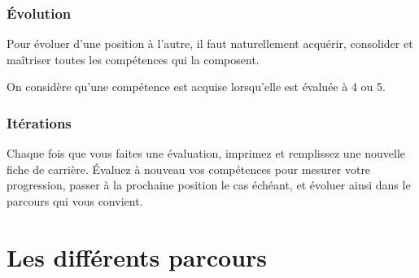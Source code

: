 \documentclass[a4paper, french, openany, 12pt]{book}
\begin{document}
\begin{multicols}{2}
  \section*{Évolution}
  
  Pour évoluer d'une position à l'autre, il faut naturellement acquérir, consolider et maîtriser toutes les compétences
  qui la composent.

  On considère qu'une compétence est acquise lorsqu'elle est évaluée à 4 ou 5.

  \section*{Itérations}

  Chaque fois que vous faites une évaluation, imprimez et remplissez une nouvelle fiche de carrière.
  Évaluez à nouveau vos compétences pour mesurer votre progression, passer à la prochaine position le cas échéant,
  et évoluer ainsi dans le parcours qui vous convient.

\end{multicols}

\part{Les différents parcours}

\begin{center}
\end{center}
\end{document}
